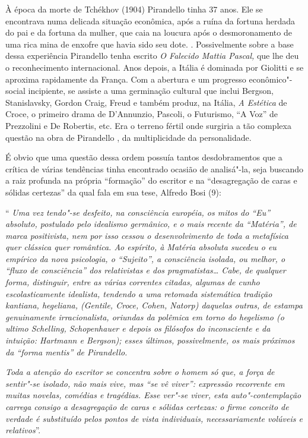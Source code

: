 À época da morte de Tchékhov (1904) Pirandello tinha 37 anos. Ele se
encontrava numa delicada situação econômica, após a ruína da fortuna
herdada do pai e da fortuna da mulher, que caia na loucura após o
desmoronamento de uma rica mina de enxofre que havia sido seu dote. .
Possivelmente sobre a base dessa experiência Pirandello tenha escrito
\emph{O Falecido Mattia Pascal,} que lhe deu o reconhecimento
internacional. Anos depois, a Itália é dominada por Giolitti e se
aproxima rapidamente da França. Com a abertura e um progresso
econômico"-social incipiente, se assiste a uma germinação cultural que
inclui Bergson, Stanislavsky, Gordon Craig, Freud e também produz, na
Itália, \emph{A Estética} de Croce, o primeiro drama de D'Annunzio,
Pascoli, o Futurismo, ``A Voz'' de Prezzolini e De Robertis, etc. Era o
terreno fértil onde surgiria a tão complexa questão na obra de
Pirandello , da multiplicidade da personalidade.

É obvio que uma questão dessa ordem possuía tantos desdobramentos que a
crítica de várias tendências tinha encontrado ocasião de analisá"-la,
seja buscando a raiz profunda na própria ``formação'' do escritor e na
``desagregação de caras e sólidas certezas'' da qual fala em sua tese,
Alfredo Bosi (9):

`` \emph{Uma vez tendo"-se desfeito, na consciência européia, os mitos do
``Eu'' absoluto, postulado pelo idealismo germânico, e o mais recente da
``Matéria'', de marca positivista, nem por isso cessou o desenvolvimento
de toda a metafísica quer clássica quer romântica. Ao espírito, à
Matéria absoluta sucedeu o eu empírico da nova psicologia, o
``Sujeito'', a consciência isolada, ou melhor, o ``fluxo de
consciência'' dos relativistas e dos pragmatistas\ldots{} Cabe, de qualquer
forma, distinguir, entre as várias correntes citadas, algumas de cunho
escolasticamente idealista, tendendo a uma retomada sistemática tradição
kantiana, hegeliana, (Gentile, Croce, Cohen, Natorp) daquelas outras, de
estampa genuinamente irracionalista, oriundas da polêmica em torno do
hegelismo (o ultimo Schelling, Schopenhauer e depois os filósofos do
inconsciente e da intuição: Hartmann e Bergson); esses últimos,
possivelmente, os mais próximos da ``forma mentis'' de Pirandello. }

\emph{Toda a atenção do escritor se concentra sobre o homem só que, a
força de sentir"-se isolado, não mais vive, mas ``se vê viver'':
expressão recorrente em muitas novelas, comédias e tragédias. Esse
ver"-se viver, esta auto"-contemplação carrega consigo a desagregação de
caras e sólidas certezas: o firme conceito de verdade é substituído
pelos pontos de vista individuais, necessariamente volúveis e
relativos}''.


